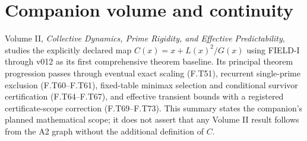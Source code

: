 \documentclass[11pt,oneside,openany]{book}
\theoremstyle{definition}
\theoremstyle{remark}
\begin{document}
\chapter*{Companion volume and continuity}
Volume II, \emph{Collective Dynamics, Prime Rigidity, and Effective Predictability}, studies the explicitly declared map \(C(x)=x+L(x)^2/G(x)\) using FIELD-I through v012 as its first comprehensive theorem baseline. Its principal theorem progression passes through eventual exact scaling (F.T51), recurrent single-prime exclusion (F.T60--F.T61), fixed-table minimax selection and conditional survivor certification (F.T64--F.T67), and effective transient bounds with a registered certificate-scope correction (F.T69--F.T73). This summary states the companion's planned mathematical scope; it does not assert that any Volume II result follows from the A2 graph without the additional definition of \(C\).
\end{document}
